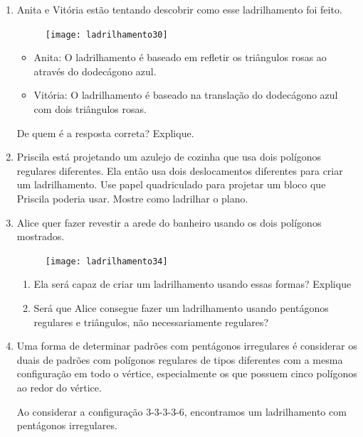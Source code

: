 \begin{enumerate}

	\item Anita e Vitória estão tentando descobrir como esse ladrilhamento foi feito.

	\begin{figure}[H]
	\centering
	\texttt{[image: ladrilhamento30]}

	\end{figure}

	\begin{itemize}
	\item Anita: O ladrilhamento é baseado em refletir os triângulos rosas ao através do dodecágono azul.
	\item Vitória: O ladrilhamento é baseado na translação do dodecágono azul com dois triângulos rosas.
	\end{itemize}

	De quem é a resposta correta? Explique.


	\item Priscila está projetando um azulejo de cozinha que usa dois polígonos regulares diferentes. Ela então usa dois deslocamentos diferentes para criar um ladrilhamento. Use papel quadriculado para projetar um bloco que Priscila poderia usar. Mostre como ladrilhar o plano.

	\item Alice quer fazer revestir a arede do banheiro usando os dois polígonos mostrados.

	\begin{figure}[H]
	\centering
	\texttt{[image: ladrilhamento34]}

	\end{figure}

	\begin{enumerate}
		\item Ela será capaz de criar um ladrilhamento usando essas formas? Explique
\item Será que Alice consegue fazer um ladrilhamento usando pentágonos regulares e triângulos, não necessariamente regulares?
	\end{enumerate}
	
	
	\item Uma forma de determinar padrões com pentágonos irregulares é considerar os duais de padrões com polígonos regulares de tipos diferentes com a mesma configuração em todo o vértice, especialmente os que possuem cinco polígonos ao redor do vértice.

Ao considerar a configuração 3-3-3-3-6, encontramos um ladrilhamento com pentágonos irregulares.


\end{enumerate}
